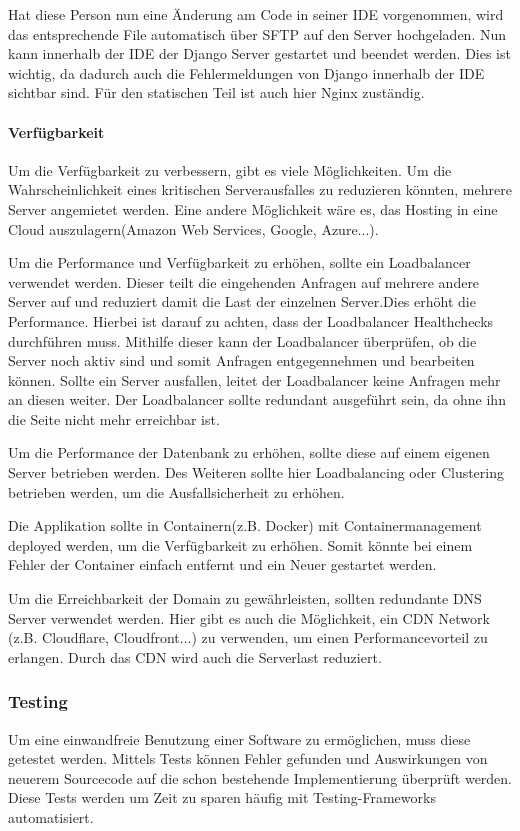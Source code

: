 Hat diese Person nun eine Änderung am Code in seiner IDE vorgenommen, wird das entsprechende File automatisch über \gls{SFTP} auf den Server hochgeladen. Nun kann innerhalb der IDE der Django Server gestartet und beendet werden. Dies ist wichtig, da dadurch auch die Fehlermeldungen von Django innerhalb der \gls{IDE} sichtbar sind. Für den statischen Teil ist auch hier Nginx zuständig.

\paragraph{Verfügbarkeit}
Um die Verfügbarkeit zu verbessern, gibt es viele Möglichkeiten. Um die Wahrscheinlichkeit eines kritischen Serverausfalles zu reduzieren könnten, mehrere Server angemietet werden. Eine andere Möglichkeit wäre es, das Hosting in eine Cloud auszulagern(Amazon Web Services, Google, Azure...). 

Um die Performance und Verfügbarkeit zu erhöhen, sollte ein Loadbalancer verwendet werden. Dieser teilt die eingehenden Anfragen auf mehrere andere Server auf und reduziert damit die Last der einzelnen Server.Dies erhöht die Performance. Hierbei ist darauf zu achten, dass der Loadbalancer Healthchecks durchführen muss. Mithilfe dieser kann der Loadbalancer überprüfen, ob die Server noch aktiv sind und somit Anfragen entgegennehmen und bearbeiten können. Sollte ein Server ausfallen, leitet der Loadbalancer keine Anfragen mehr an diesen weiter. Der Loadbalancer sollte redundant ausgeführt sein, da ohne ihn die Seite nicht mehr erreichbar ist. 

Um die Performance der Datenbank zu erhöhen, sollte diese auf einem eigenen Server betrieben werden. Des Weiteren sollte hier Loadbalancing oder Clustering betrieben werden, um die Ausfallsicherheit zu erhöhen. \cite{CLUSTER}

Die Applikation sollte in Containern(z.B. Docker) mit Containermanagement deployed werden, um die Verfügbarkeit zu erhöhen. Somit könnte bei einem Fehler der Container einfach entfernt und ein Neuer gestartet werden. 

Um die Erreichbarkeit der Domain zu gewährleisten, sollten redundante DNS Server verwendet werden. Hier gibt es auch die Möglichkeit, ein \gls{CDN} Network (z.B. Cloudflare, Cloudfront...) zu verwenden, um einen Performancevorteil zu erlangen. Durch das CDN wird auch die Serverlast reduziert.

\newpage

\subsubsection{Testing}
Um eine einwandfreie Benutzung einer Software zu ermöglichen, muss diese getestet werden. Mittels Tests können Fehler gefunden und Auswirkungen von neuerem Sourcecode auf die schon bestehende Implementierung überprüft werden. Diese Tests werden um Zeit zu sparen häufig mit Testing-Frameworks automatisiert.

